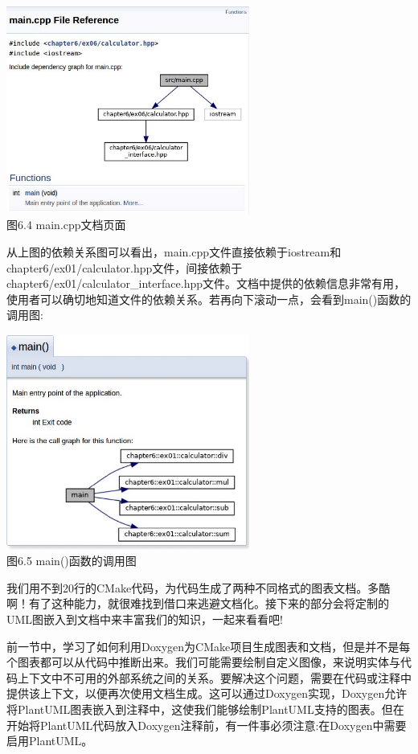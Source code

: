 \begin{center}
\includegraphics[width=0.6\textwidth]{content/2/chapter6/images/4.jpg}\\
图6.4  main.cpp文档页面
\end{center}

从上图的依赖关系图可以看出，main.cpp文件直接依赖于iostream和chapter6/ex01/calculator.hpp文件，间接依赖于chapter6/ex01/calculator\_interface.hpp文件。文档中提供的依赖信息非常有用，使用者可以确切地知道文件的依赖关系。若再向下滚动一点，会看到main()函数的调用图:

\begin{center}
\includegraphics[width=0.6\textwidth]{content/2/chapter6/images/5.jpg}\\
图6.5  main()函数的调用图
\end{center}

我们用不到20行的CMake代码，为代码生成了两种不同格式的图表文档。多酷啊！有了这种能力，就很难找到借口来逃避文档化。接下来的部分会将定制的UML图嵌入到文档中来丰富我们的知识，一起来看看吧!
 

前一节中，学习了如何利用Doxygen为CMake项目生成图表和文档，但是并不是每个图表都可以从代码中推断出来。我们可能需要绘制自定义图像，来说明实体与代码上下文中不可用的外部系统之间的关系。要解决这个问题，需要在代码或注释中提供该上下文，以便再次使用文档生成。这可以通过Doxygen实现，Doxygen允许将PlantUML图表嵌入到注释中，这使我们能够绘制PlantUML支持的图表。但在开始将PlantUML代码放入Doxygen注释前，有一件事必须注意:在Doxygen中需要启用PlantUML。

